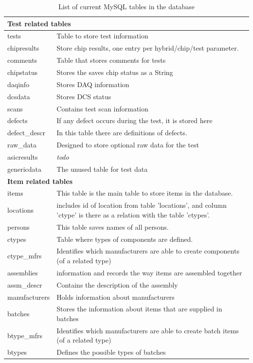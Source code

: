\begin{longtable}{|p{4cm}|p{10cm}|}
	\caption{List of current MySQL tables in the database\label{tab:mysqlTables}}
	\\
	
		\multicolumn{2}{l}{\textbf{Test related tables}} \\ \hline
		tests & Table to store test information \\ \hline
		chipresults & Store chip results, one entry per hybrid/chip/test parameter.\\ \hline
		comments & Table that stores comments for tests\\ \hline
		chipstatus & Stores the saves chip status as a String \\ \hline
		daqinfo & Stores DAQ information\\ \hline
		dcsdata & Stores DCS status\\ \hline
		scans & Contains test scan information\\ \hline
		defects & If any defect occurs during the test, it is stored here\\ \hline
		defect\_descr & In this table there are definitions of defects.\\ \hline
		raw\_data & Designed to store optional raw data for the test\\ \hline
		asicresults & \emph{todo} \\ \hline  %
		genericdata & The unused table for test data\\ \hline
				
		\multicolumn{2}{l}{\textbf{Item related tables}} \\ \hline
		items & This table is the main table to store items in the database. \\ \hline
		locations &  includes id of location from table 'locations', and column 'ctype' is there as a relation with the table 'ctypes'.\\ \hline
		persons & This table saves names of all persons.\\ \hline
		ctypes & Table where types of components are defined.\\ \hline
		ctype\_mfrs &  Identifies which manufacturers are able to create components (of a related type)\\ \hline
		assemblies & information and records the way items are assembled together\\ \hline
		assm\_descr & Contains the description of the assembly\\ \hline
		manufacturers & Holds information about manufacturers\\ \hline
		batches & Stores the information about items that are supplied in batches \\ \hline
		btype\_mfrs & Identifies which manufacturers are able to create batch items (of a related type)\\ \hline
		btypes & Defines the possible types of batches\\ \hline


\end{longtable}

